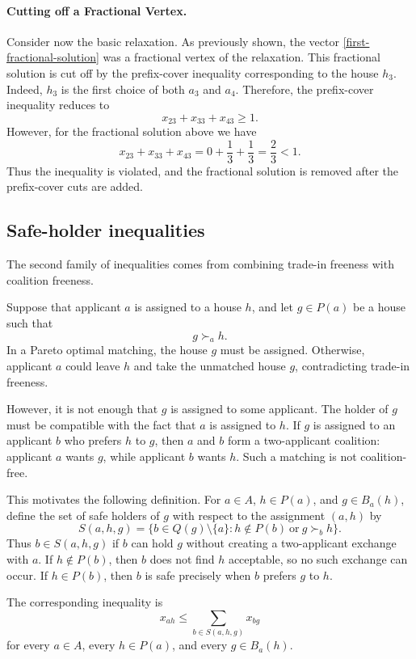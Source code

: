 \documentclass[12pt]{report}
\numberwithin{algorithm}{chapter}
\begin{document}
	\paragraph{Cutting off a Fractional Vertex.} Consider now the basic relaxation. As previously shown, the vector \eqref{first-fractional-solution} was a fractional vertex of the relaxation. This fractional solution is cut off by the prefix-cover inequality corresponding to the house $h_3$. 
	Indeed, $h_3$ is the first choice of both $a_3$ and $a_4$. 
	Therefore, the prefix-cover inequality reduces to
	\[
	x_{23}+x_{33}+x_{43}\ge 1.
	\]
	However, for the fractional solution above we have
	\[
	x_{23}+x_{33}+x_{43}
	=
	0+\frac{1}{3}+\frac{1}{3}
	=
	\frac{2}{3}<1.
	\]
	Thus the inequality is violated, and the fractional solution is removed after the prefix-cover cuts are added.
	
	\subsection{Safe-holder inequalities}
	
	The second family of inequalities comes from combining trade-in freeness with coalition freeness.
	
	Suppose that applicant $a$ is assigned to a house $h$, and let $g\in P(a)$ be a house such that
	\[
	g\succ_{a} h.
	\]
	In a Pareto optimal matching, the house $g$ must be assigned. Otherwise, applicant $a$ could leave $h$ and take the unmatched house $g$, contradicting trade-in freeness.
	
	However, it is not enough that $g$ is assigned to some applicant. The holder of $g$ must be compatible with the fact that $a$ is assigned to $h$. If $g$ is assigned to an applicant $b$ who prefers $h$ to $g$, then $a$ and $b$ form a two-applicant coalition: applicant $a$ wants $g$, while applicant $b$ wants $h$. Such a matching is not coalition-free.
	
	This motivates the following definition. For $a\in A$, $h\in P(a)$, and $g\in B_a(h)$, define the set of safe holders of $g$ with respect to the assignment $(a,h)$ by
	\[
	S(a,h,g)
	=
	\{b\in Q(g)\setminus\{a\}: h\notin P(b)\ \text{or}\ g\succ_b h\}.
	\]
	Thus $b\in S(a,h,g)$ if $b$ can hold $g$ without creating a two-applicant exchange with $a$. If $h\notin P(b)$, then $b$ does not find $h$ acceptable, so no such exchange can occur. If $h\in P(b)$, then $b$ is safe precisely when $b$ prefers $g$ to $h$.
	
	The corresponding inequality is
	\[
	\boxed{
		x_{ah}
		\le
		\sum_{b\in S(a,h,g)}x_{bg}
	}
	\]
	for every $a\in A$, every $h\in P(a)$, and every $g\in B_a(h)$.
	
\end{document}
